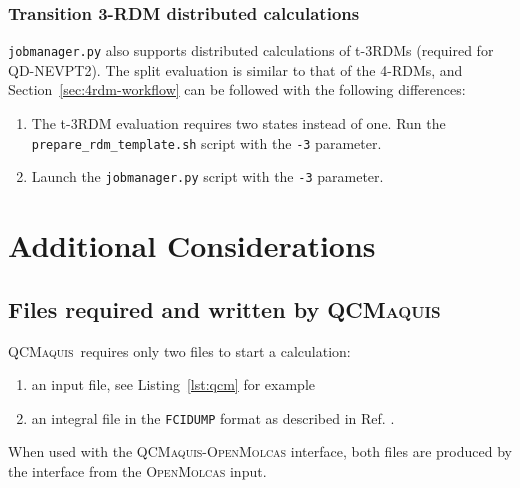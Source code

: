 \documentclass[bibliography=totoc,12pt,a4paper]{scrartcl}
\newcommand{\mol}{\textsc{OpenMolcas}}
\newcommand{\qcm}{\textsc{QCMaquis}}
\newcommand{\kwd}[1]{\texttt{#1}}
\begin{document}
\subsubsection{Transition 3-RDM distributed calculations}

\kwd{jobmanager.py} also supports distributed calculations of t-3RDMs (required for QD-NEVPT2). The split evaluation is similar to that of the 4-RDMs, and Section~\ref{sec:4rdm-workflow} can be followed with the following differences:
\begin{enumerate}
 \item The t-3RDM evaluation requires two states instead of one. Run the \\
 \kwd{prepare\_rdm\_template.sh} script with the \kwd{-3} parameter.
 \item Launch the \kwd{jobmanager.py} script with the \kwd{-3} parameter.
\end{enumerate}

\section{Additional Considerations}

\subsection{Files required and written by \qcm}\label{sec:file-req-qcm}

\qcm\ requires only two files to start a calculation:

\begin{enumerate}
 \item an input file, see Listing~\ref{lst:qcm} for example
 \item an integral file in the \texttt{FCIDUMP} format as described in Ref. .
\end{enumerate}

When used with the \qcm{}-\mol{} interface, both files are produced by the interface from the \mol{} input.
\end{document}
